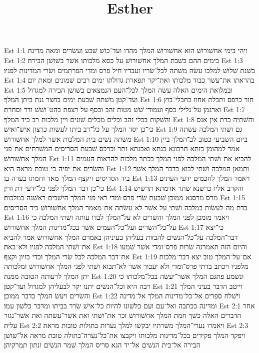 

\title{Esther}

Est 1:1  ויהי בימי אחשׁורושׁ הוא אחשׁורושׁ המלך מהדו ועד־כושׁ שׁבע ועשׂרים ומאה מדינה׃
Est 1:2  בימים ההם כשׁבת המלך אחשׁורושׁ על כסא מלכותו אשׁר בשׁושׁן הבירה׃
Est 1:3  בשׁנת שׁלושׁ למלכו עשׂה משׁתה לכל־שׂריו ועבדיו חיל פרס ומדי הפרתמים ושׂרי המדינות לפניו׃
Est 1:4  בהראתו את־עשׁר כבוד מלכותו ואת־יקר תפארת גדולתו ימים רבים שׁמונים ומאת יום׃
Est 1:5  ובמלואת הימים האלה עשׂה המלך לכל־העם הנמצאים בשׁושׁן הבירה למגדול ועד־קטן משׁתה שׁבעת ימים בחצר גנת ביתן המלך׃
Est 1:6  חור כרפס ותכלת אחוז בחבלי־בוץ וארגמן על־גלילי כסף ועמודי שׁשׁ מטות זהב וכסף על רצפת בהט־ושׁשׁ ודר וסחרת׃
Est 1:7  והשׁקות בכלי זהב וכלים מכלים שׁונים ויין מלכות רב כיד המלך׃
Est 1:8  והשׁתיה כדת אין אנס כי־כן יסד המלך על כל־רב ביתו לעשׂות כרצון אישׁ־ואישׁ׃
Est 1:9  גם ושׁתי המלכה עשׂתה משׁתה נשׁים בית המלכות אשׁר למלך אחשׁורושׁ׃
Est 1:10  ביום השׁביעי כטוב לב־המלך ביין אמר למהומן בזתא חרבונא בגתא ואבגתא זתר וכרכס שׁבעת הסריסים המשׁרתים את־פני המלך אחשׁורושׁ׃
Est 1:11  להביא את־ושׁתי המלכה לפני המלך בכתר מלכות להראות העמים והשׂרים את־יפיה כי־טובת מראה היא׃
Est 1:12  ותמאן המלכה ושׁתי לבוא בדבר המלך אשׁר ביד הסריסים ויקצף המלך מאד וחמתו בערה בו׃
Est 1:13  ויאמר המלך לחכמים ידעי העתים כי־כן דבר המלך לפני כל־ידעי דת ודין׃
Est 1:14  והקרב אליו כרשׁנא שׁתר אדמתא תרשׁישׁ מרס מרסנא ממוכן שׁבעת שׂרי פרס ומדי ראי פני המלך הישׁבים ראשׁנה במלכות׃
Est 1:15  כדת מה־לעשׂות במלכה ושׁתי על אשׁר לא־עשׂתה את־מאמר המלך אחשׁורושׁ ביד הסריסים׃
Est 1:16  ויאמר מומכן לפני המלך והשׂרים לא על־המלך לבדו עותה ושׁתי המלכה כי על־כל־השׂרים ועל־כל־העמים אשׁר בכל־מדינות המלך אחשׁורושׁ׃
Est 1:17  כי־יצא דבר־המלכה על־כל־הנשׁים להבזות בעליהן בעיניהן באמרם המלך אחשׁורושׁ אמר להביא את־ושׁתי המלכה לפניו ולא־באה׃
Est 1:18  והיום הזה תאמרנה שׂרות פרס־ומדי אשׁר שׁמעו את־דבר המלכה לכל שׂרי המלך וכדי בזיון וקצף׃
Est 1:19  אם־על־המלך טוב יצא דבר־מלכות מלפניו ויכתב בדתי פרס־ומדי ולא יעבור אשׁר לא־תבוא ושׁתי לפני המלך אחשׁורושׁ ומלכותה יתן המלך לרעותה הטובה ממנה׃
Est 1:20  ונשׁמע פתגם המלך אשׁר־יעשׂה בכל־מלכותו כי רבה היא וכל־הנשׁים יתנו יקר לבעליהן למגדול ועד־קטן׃
Est 1:21  וייטב הדבר בעיני המלך והשׂרים ויעשׂ המלך כדבר ממוכן׃
Est 1:22  וישׁלח ספרים אל־כל־מדינות המלך אל־מדינה ומדינה ככתבה ואל־עם ועם כלשׁונו להיות כל־אישׁ שׂרר בביתו ומדבר כלשׁון עמו׃
Est 2:1  אחר הדברים האלה כשׁך חמת המלך אחשׁורושׁ זכר את־ושׁתי ואת אשׁר־עשׂתה ואת אשׁר־נגזר עליה׃
Est 2:2  ויאמרו נערי־המלך משׁרתיו יבקשׁו למלך נערות בתולות טובות מראה׃
Est 2:3  ויפקד המלך פקידים בכל־מדינות מלכותו ויקבצו את־כל־נערה־בתולה טובת מראה אל־שׁושׁן הבירה אל־בית הנשׁים אל־יד הגא סריס המלך שׁמר הנשׁים ונתון תמרקיהן׃
